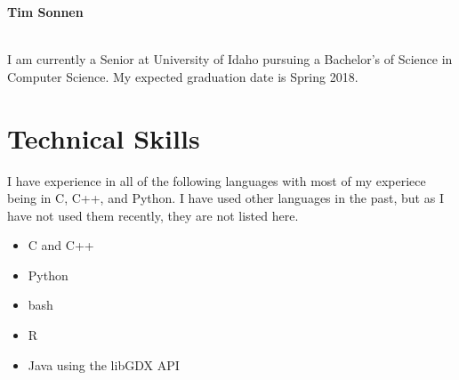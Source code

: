 \documentclass[10pt]{article}
\begin{document}
\noindent
\centerline{\textbf{Tim Sonnen}}

\centerline{}
\vspace{2mm}
\noindent
\\ I am currently a Senior at University of Idaho pursuing a Bachelor's of Science in Computer Science. My expected graduation date is Spring 2018.
\section*{Technical Skills}
	\vspace{2mm}
	\begin{adjustwidth}{5mm}{}
	I have experience in all of the following languages with most of my experiece 
	being in C, C++, and Python. I have used other languages in the past, but as 
	I have not used them recently, they are not listed here.
	  \begin{itemize}[noitemsep, nolistsep]
	  	\item C and C++
	  	\item Python
	  	\item bash
	  	\item R
	  	\item Java using the libGDX API
	  \end{itemize}
	\end{adjustwidth}
\end{document}
